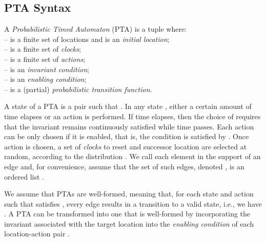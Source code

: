 \subsection{PTA Syntax}
A \textit{Probabilistic Timed Automaton} (PTA) is a tuple  where: \\
–  is a finite set of locations and  is an \textit{initial location}; \\
–  is a finite set of \textit{clocks}; \\
–  is a finite set of \textit{actions}; \\
–  is an \textit{\textit{invariant condition}}; \\
–  is an \textit{enabling condition}; \\
–  is a (partial) \textit{\textit{probabilistic transition function}}.
\par A state of a PTA is a pair such that . In any state , either a certain amount of time  elapses or an action  is performed. If time elapses, then the choice of  requires that  the invariant  remains continuously satisfied while time passes. Each action  can be only chosen if it is enabled, that is, the condition  is satisfied by . Once action  is chosen, a set of \textit{clocks} to reset and successor location are selected at random, according to the distribution . We call each element  in the support of  an edge and, for convenience, assume that the set of such edges, denoted , is an ordered list .
\par We assume that PTAs are well-formed, meaning that, for each state  and action  such that  satisfies , every edge  results in a transition to a valid state, i.e., we have . A PTA can be transformed into one that is well-formed by incorporating the invariant associated with the target location into the \textit{enabling condition} of each location-action pair \cite{kwiatkowska2007symbolic}.\\

